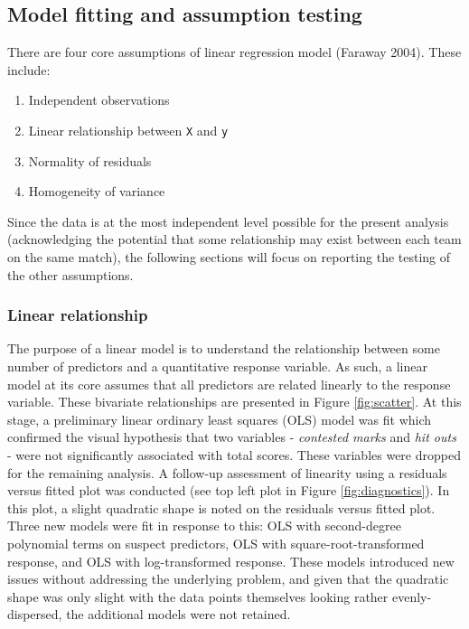 \documentclass{article}
\begin{document}
\hypertarget{model-fitting-and-assumption-testing}{%
\subsection{Model fitting and assumption testing}\label{model-fitting-and-assumption-testing}}

There are four core assumptions of linear regression model (Faraway 2004). These include:

\begin{enumerate}
\def\labelenumi{\arabic{enumi}.}
\tightlist
\item
  Independent observations
\item
  Linear relationship between \texttt{X} and \texttt{y}
\item
  Normality of residuals
\item
  Homogeneity of variance
\end{enumerate}

Since the data is at the most independent level possible for the present analysis (acknowledging the potential that some relationship may exist between each team on the same match), the following sections will focus on reporting the testing of the other assumptions.

\hypertarget{linear-relationship}{%
\subsubsection{Linear relationship}\label{linear-relationship}}

The purpose of a linear model is to understand the relationship between some number of predictors and a quantitative response variable. As such, a linear model at its core assumes that all predictors are related linearly to the response variable. These bivariate relationships are presented in Figure \ref{fig:scatter}. At this stage, a preliminary linear ordinary least squares (OLS) model was fit which confirmed the visual hypothesis that two variables - \emph{contested marks} and \emph{hit outs} - were not significantly associated with total scores. These variables were dropped for the remaining analysis. A follow-up assessment of linearity using a residuals versus fitted plot was conducted (see top left plot in Figure \ref{fig:diagnostics}). In this plot, a slight quadratic shape is noted on the residuals versus fitted plot. Three new models were fit in response to this: OLS with second-degree polynomial terms on suspect predictors, OLS with square-root-transformed response, and OLS with log-transformed response. These models introduced new issues without addressing the underlying problem, and given that the quadratic shape was only slight with the data points themselves looking rather evenly-dispersed, the additional models were not retained.
\end{document}
